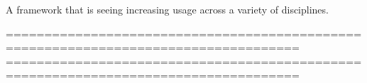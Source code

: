 A framework that is seeing increasing usage across a variety of disciplines.



====================================================================================
====================================================================================